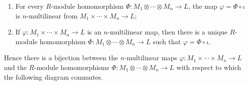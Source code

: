 \documentclass[../notes.tex]{subfiles}
\begin{document}
\begin{itemize}
\begin{corollary}
\begin{enumerate}
            \item For every $R$-module homomorphism $\Phi:M_1\otimes\cdots\otimes M_n\to L$, the map $\varphi=\Phi\circ\iota$ is $n$-multilinear from $M_1\times\cdots\times M_n\to L$;
            \item If $\varphi:M_1\times\cdots\times M_n\to L$ is an $n$-multilinear map, then there is a unique $R$-module homomorphism $\Phi:M_1\otimes\cdots\otimes M_n\to L$ such that $\varphi=\Phi\circ\iota$.
        \end{enumerate}
        Hence there is a bijection between the $n$-multilinear maps $\varphi:M_1\times\cdots\times M_n\to L$ and the $R$-module homomorphisms $\Phi:M_1\otimes\cdots\otimes M_n\to L$ with respect to which the following diagram commutes.
        \begin{figure}[H]
            \centering
\end{figure}
\end{corollary}
\end{itemize}
\end{document}
